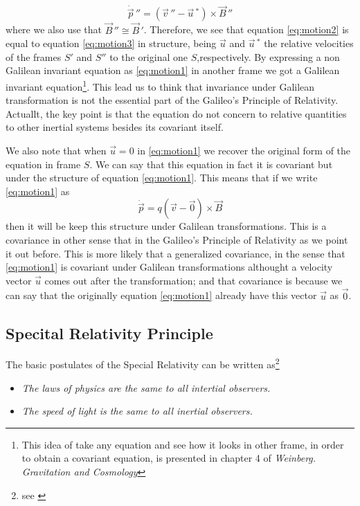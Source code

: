 \documentclass[11pt, letterpaper]{article}
\begin{document}
\begin{equation}
	\dot{\vec{p}}\,''=(\vec{v}\,''-\vec{u}\,^*)\times \vec{B}\,'' \label{eq:motion3}
\end{equation}
where we also use that $\vec{B}\,''\cong \vec{B}\,'$. Therefore, we see that equation \ref{eq:motion2} is equal to equation \ref{eq:motion3} in structure, being $\vec{u}$ and $\vec{u}\,^*$ the relative velocities of the frames $S'$ and $S''$ to the original one $S$,respectively. By expressing a non Galilean invariant equation as \ref{eq:motion1} in another frame we got a Galilean invariant equation\footnote{This idea of take any equation and see how it looks in other frame, in order to obtain a covariant equation, is presented in chapter 4 of \textit{Weinberg. Gravitation and Cosmology}\cite{weinberg}}. This lead us to think that invariance under Galilean transformation is not the essential part of the Galileo's Principle of Relativity. Actuallt, the key point is that the equation do not concern to relative quantities to other inertial systems besides its covariant itself.

We also note that when $\vec{u}=0$ in \ref{eq:motion1} we recover the original form of the equation in frame $S$. We can say that this equation in fact it is covariant but under the structure of equation \ref{eq:motion1}. This means that if we write \ref{eq:motion1} as 
$$\dot{\vec{p}}=q(\vec{v}-\vec{0})\times \vec{B}$$
then it will be keep this structure under Galilean transformations. This is a covariance in other sense that in the Galileo's Principle of Relativity as we point it out before. This is more likely that a generalized covariance, in the sense that \ref{eq:motion1} is covariant under Galilean transformations althought a velocity vector $\vec{u}$ comes out after the transformation; and that covariance is because we can say that the originally equation \ref{eq:motion1} already have this vector $\vec{u}$ as $\vec{0}$.

\subsection*{Specital Relativity Principle}
The basic postulates of the Special Relativity can be written as\footnote{see \cite{goldstein}}
\begin{itemize}
	\item[\textit{1.}] \textit{The laws of physics are the same to all intertial observers.}
	\item[\textit{2.}] \textit{The speed of light is the same to all inertial observers.}
\end{itemize}
\end{document}
